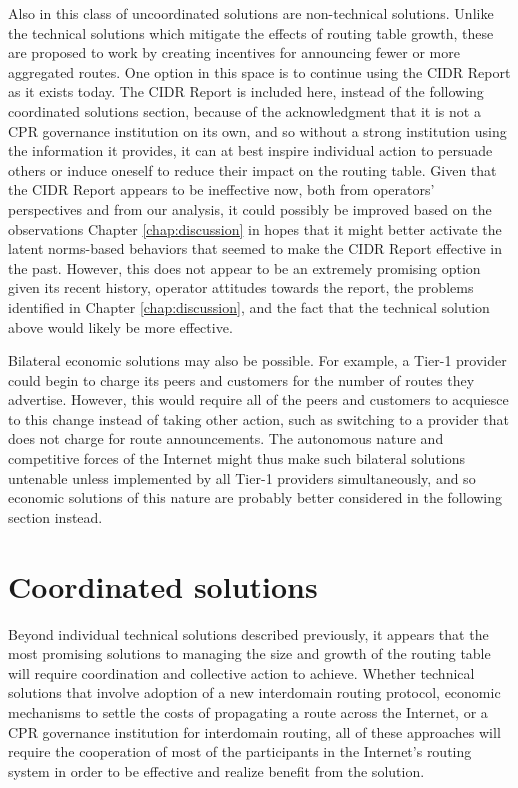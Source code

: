 Also in this class of uncoordinated solutions are non-technical solutions.
Unlike the technical solutions which mitigate the effects of routing table
growth, these are proposed to work by creating incentives for announcing fewer
or more aggregated routes. One option in this space is to continue using the
CIDR Report as it exists today. The CIDR Report is included here, instead of the
following coordinated solutions section, because of the acknowledgment that it
is not a CPR governance institution on its own, and so without a strong
institution using the information it provides, it can at best inspire
individual action to persuade others or induce oneself to reduce their impact
on the routing table. Given that the CIDR Report appears to be ineffective now,
both from operators' perspectives and from our analysis, it could possibly be
improved based on the observations Chapter \ref{chap:discussion} in hopes that it
might better activate the latent norms-based behaviors that seemed to make the
CIDR Report effective in the past. However, this does not appear to be an
extremely promising option given its recent history, operator attitudes towards
the report, the problems identified in Chapter \ref{chap:discussion}, and the
fact that the technical solution above would likely be more effective.

Bilateral economic solutions may also be possible. For example, a Tier-1
provider could begin to charge its peers and customers for the number of routes
they advertise. However, this would require all of the peers and customers to
acquiesce to this change instead of taking other action, such as switching
to a provider that does not charge for route announcements. The autonomous
nature and competitive forces of the Internet might thus make such bilateral
solutions untenable unless implemented by all Tier-1 providers simultaneously,
and so economic solutions of this nature are probably better considered in the
following section instead.

\section{Coordinated solutions}
Beyond individual technical solutions described previously, it appears that the
most promising solutions to managing the size and growth of the routing table
will require coordination and collective action to achieve. Whether technical
solutions that involve adoption of a new interdomain routing protocol, economic
mechanisms to settle the costs of propagating a route across the Internet, or
a CPR governance institution for interdomain routing, all of these approaches
will require the cooperation of most of the participants in the Internet's
routing system in order to be effective and realize benefit from the solution.

